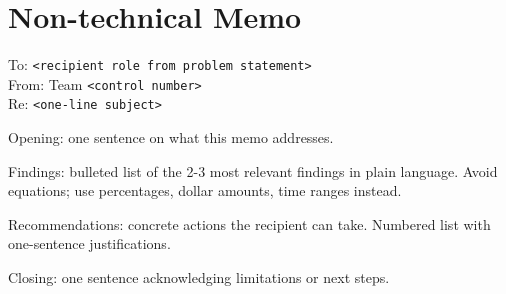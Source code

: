 
\section{Non-technical Memo}
\label{sec:memo}


To: \texttt{<recipient role from problem statement>} \\
From: Team \texttt{<control number>} \\
Re:   \texttt{<one-line subject>}

\medskip

Opening: one sentence on what this memo addresses.

\medskip

Findings: bulleted list of the 2-3 most relevant findings in plain language.
Avoid equations; use percentages, dollar amounts, time ranges instead.

\medskip

Recommendations: concrete actions the recipient can take. Numbered list with
one-sentence justifications.

\medskip

Closing: one sentence acknowledging limitations or next steps.
